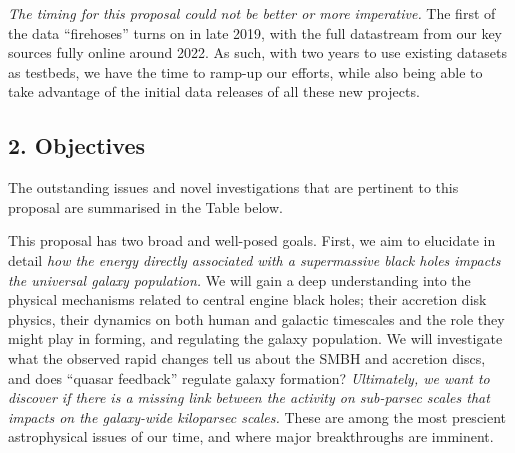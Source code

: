 \smallskip
\smallskip
\noindent
{\it The timing for this proposal could not be better or more imperative.} 
The first of the data ``firehoses'' turns on in late 2019, with
the full datastream from our key sources fully online around 2022. 
As such, with two years to use existing datasets as testbeds, we 
have the time to ramp-up our efforts, while also being able to 
take advantage of the initial data releases of all these new projects. 




\subsection*{2. Objectives}

\smallskip
\smallskip
\noindent
The outstanding issues and novel investigations 
that are pertinent to this proposal are summarised in the Table below. 

\smallskip
\smallskip
\noindent


\iffalse
\smallskip 
\smallskip
\noindent
This proposal has two broad and well-posed goals.  
First, we aim to
elucidate in detail {\it how the energy directly associated with a
supermassive black holes impacts the universal galaxy population.}  We
will gain a deep understanding into the physical mechanisms related to
central engine black holes; their accretion disk physics, their
dynamics on both human and galactic timescales and the role they might
play in forming, and regulating the galaxy population. 
We will investigate what the observed rapid changes tell us about the SMBH and accretion discs, 
and does ``quasar feedback'' regulate galaxy formation?
{\it Ultimately, we want to discover if there is a missing link between the 
activity on sub-parsec scales that impacts on the galaxy-wide kiloparsec scales.}
These are among the most prescient astrophysical issues of our time, 
and where major breakthroughs are imminent.

